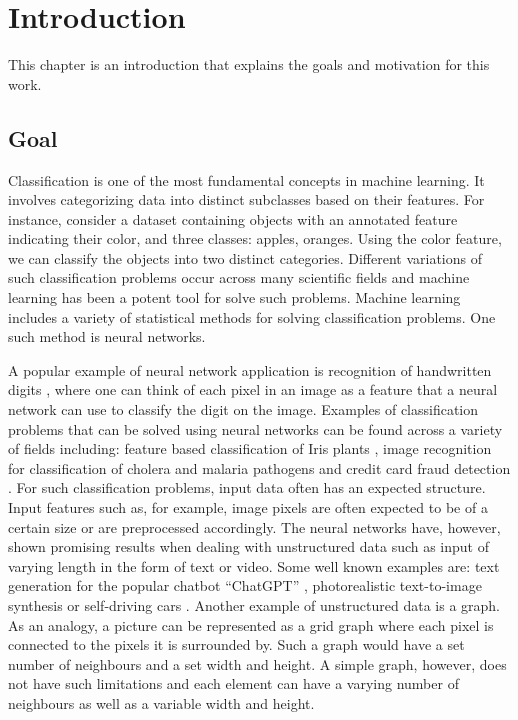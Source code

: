 \chapter{Introduction}

This chapter is an introduction that explains the goals and motivation for this work.

\section{Goal}

Classification is one of the most fundamental concepts in machine learning. It involves categorizing data into distinct subclasses based on their features. For instance, consider a dataset containing objects with an annotated feature indicating their color, and three classes: apples, oranges. Using the color feature, we can classify the objects into two distinct categories. Different variations of such classification problems occur across many scientific fields and machine learning has been a potent tool for solve such problems. Machine learning includes a variety of statistical methods for solving classification problems. One such method is neural networks. 

A popular example of neural network application is recognition of handwritten digits \cite{digitrecognition}, where one can think of each pixel in an image as a feature that a neural network can use to classify the digit on the image. Examples of classification problems that can be solved using neural networks can be found across a variety of fields including: feature based classification of Iris plants \cite{swain2012approach}, image recognition for classification of cholera and malaria pathogens \cite{TRAORE2018257} and credit card fraud detection \cite{cardfraud}. For such classification problems, input data often has an expected structure. Input features such as, for example, image pixels are often expected to be of a certain size or are preprocessed accordingly. The neural networks have, however, shown promising results when dealing with unstructured data such as input of varying length in the form of text or video. Some well known examples are: text generation for the popular chatbot “ChatGPT” \cite{RAY2023121}, photorealistic text-to-image synthesis \cite{Liao2022CVPR} or self-driving cars \cite{bojarski2016end}. Another example of unstructured data is a graph. As an analogy, a picture can be represented as a grid graph where each pixel is connected to the pixels it is surrounded by. Such a graph would have a set number of neighbours and a set width and height. A simple graph, however, does not have such limitations and each element can have a varying number of neighbours as well as a variable width and height. 

